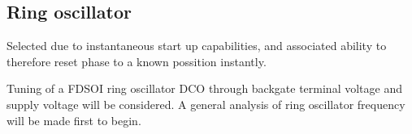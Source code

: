 
	



\FloatBarrier\pagebreak
\subsection{Ring oscillator}

	Selected due to instantaneous start up capabilities, and associated ability to therefore reset phase to a known possition instantly.

		Tuning of a FDSOI ring oscillator DCO through backgate terminal voltage and supply voltage will be considered. A general analysis of ring oscillator frequency will be made first to begin.

